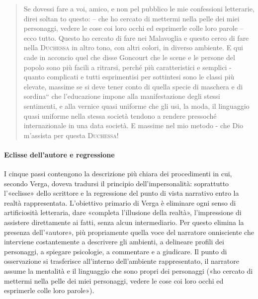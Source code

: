 \documentclass{book}
\newcounter{mar}
\begin{document}
\begin{quote}
Se dovessi fare a voi, amico, e non pel pubblico le mie confessioni letterarie, direi soltan to questo: – che ho cercato di mettermi nella pelle dei miei personaggi, vedere le cose coi loro occhi ed esprimerle colle loro parole – ecco tutto. Questo ho cercato di fare nei Malavoglia e questo cerco di fare nella \textsc{Duchessa} in altro tono, con altri colori, in diverso ambiente. E qui cade in acconcio quel che disse Goncourt che le scene e le persone del popolo sono più facili a ritrarsi, perché più caratteristici e semplici - quanto complicati e tutti esprimentisi per sottintesi sono le classi più elevate, massime se si deve tener conto di quella specie di maschera e di sordina“ che l'educazione impone alla manifestazione degli stessi sentimenti, e alla vernice quasi uniforme che gli usi, la moda, il linguaggio quasi uniforme nella stessa società tendono a rendere pressoché internazionale in una data società. E massime nel mio metodo - che Dio m'assista per questa  \textsc{Duchessa}!
\end{quote}

\paragraph{Eclisse dell'autore e regressione} I cinque passi contengono la descrizione più chiara dei procedimenti in cui, secondo Verga, doveva tradursi il principio dell'impersonalità: soprattutto l'«eclisse» dello scrittore e la regressione del punto di vista narrativo entro la realtà rappresentata. L'obiettivo primario di Verga è eliminare ogni senso di artificiosità letteraria, dare «completa l'illusione della realtà», l'impressione di assistere direttamente ai fatti, senza alcun intermediario. Per questo elimina la presenza dell'«autore», più propriamente quella voce del narratore onnisciente che interviene costantemente a descrivere gli ambienti, a delineare profili dei personaggi, a spiegare psicologie, a commentare e a giudicare. Il punto di osservazione si trasferisce all'interno dell'ambiente rappresentato, il narratore assume la mentalità e il linguaggio che sono propri dei personaggi («ho cercato di mettermi nella pelle dei miei personaggi, vedere le cose coi loro occhi ed esprimerle colle loro parole»).
\end{document}
